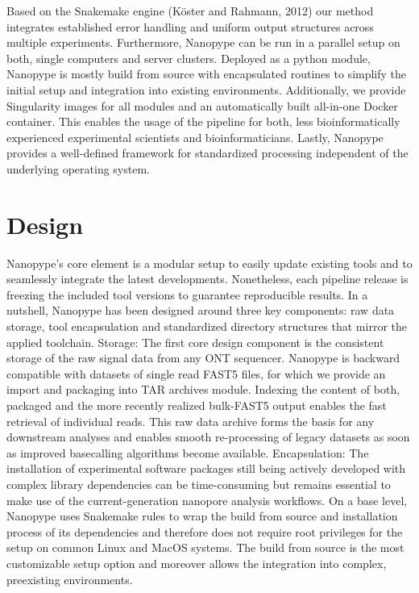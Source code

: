 Based on the Snakemake engine (Köster and Rahmann, 2012) our method integrates established error handling and uniform output structures across multiple experiments. Furthermore, Nanopype can be run in a parallel setup on both, single computers and server clusters. Deployed as a python module, Nanopype is mostly build from source with encapsulated routines to simplify the initial setup and integration into existing environments. Additionally, we provide Singularity images for all modules and an automatically built all-in-one Docker container. This enables the usage of the pipeline for both, less bioinformatically experienced experimental scientists and bioinformaticians. Lastly, Nanopype provides a well-defined framework for standardized processing independent of the underlying operating system.

\section{Design}
\label{sec:nanopype:design}
Nanopype’s core element is a modular setup to easily update existing tools and to seamlessly integrate the latest developments. Nonetheless, each pipeline release is freezing the included tool versions to guarantee reproducible results. In a nutshell, Nanopype has been designed around three key components: raw data storage, tool encapsulation and standardized directory structures that mirror the applied toolchain.
Storage: The first core design component is the consistent storage of the raw signal data from any ONT sequencer. Nanopype is backward compatible with datasets of single read FAST5 files, for which we provide an import and packaging into TAR archives module. Indexing the content of both, packaged and the more recently realized bulk-FAST5 output enables the fast retrieval of individual reads. This raw data archive forms the basis for any downstream analyses and enables smooth re-processing of legacy datasets as soon as improved basecalling algorithms become available.
Encapsulation: The installation of experimental software packages still being actively developed with complex library dependencies can be time-consuming but remains essential to make use of the current-generation nanopore analysis workflows. On a base level, Nanopype uses Snakemake rules to wrap the build from source and installation process of its dependencies and therefore does not require root privileges for the setup on common Linux and MacOS systems. The build from source is the most customizable setup option and moreover allows the integration into complex, preexisting environments.
